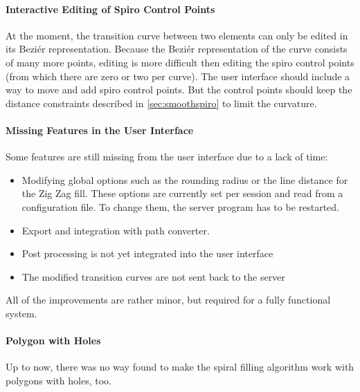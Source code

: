 \paragraph{Interactive Editing of Spiro Control Points} At the moment, the transition curve between two elements can only be edited in its Beziér representation. Because the Beziér representation of the curve consists of many more points, editing is more difficult then editing the spiro control points (from which there are zero or two per curve). The user interface should include a way to move and add spiro control points. But the control points should keep the distance constraints described in \autoref{sec:smoothspiro} to limit the curvature.

\paragraph{Missing Features in the User Interface} Some features are still missing from the user interface due to a lack of time: 

\begin{itemize}
\item Modifying global options such as the rounding radius or the line distance for the Zig Zag fill. These options are currently set per session and read from a configuration file. To change them, the server program has to be restarted.
\item Export and integration with path converter.
\item Post processing is not yet integrated into the user interface
\item The modified transition curves are not sent back to the server
\end{itemize}

All of the improvements are rather minor, but required for a fully functional system.

\paragraph{Polygon with Holes}

Up to now, there was no way found to make the spiral filling algorithm work with polygons with holes, too. 

